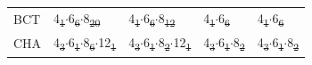 \documentclass[preprint,numrefs,noinfo,sort&compress]{elsarticle}
\providecommand{\DIFadd}[1]{{\protect\color{blue}\uwave{#1}}} %
\providecommand{\DIFdel}[1]{{\protect\color{red}\sout{#1}}}                      %
\providecommand{\DIFaddFL}[1]{\DIFadd{#1}} %
\providecommand{\DIFdelFL}[1]{\DIFdel{#1}} %
\providecommand{\DIFaddbeginFL}{} %
\providecommand{\DIFaddendFL}{} %
\providecommand{\DIFdelbeginFL}{} %
\providecommand{\DIFdelendFL}{} %
\newcommand{\DIFscaledelfig}{0.5}
\newlength{\DIFdelgraphicswidth} %
\newlength{\DIFdelgraphicsheight} %
\newcommand{\DIFaddincludegraphics}[2][]{{\color{blue}\fbox{\DIFOincludegraphics[#1]{#2}}}} %
\newcommand{\DIFdelincludegraphics}[2][]{%
\sbox{\DIFdelgraphicsbox}{\DIFOincludegraphics[#1]{#2}}%
\settoboxwidth{\DIFdelgraphicswidth}{\DIFdelgraphicsbox} %
\settoboxtotalheight{\DIFdelgraphicsheight}{\DIFdelgraphicsbox} %
\scalebox{\DIFscaledelfig}{%
\parbox[b]{\DIFdelgraphicswidth}{\usebox{\DIFdelgraphicsbox}\\[-\baselineskip] \rule{\DIFdelgraphicswidth}{0em}}\llap{\resizebox{\DIFdelgraphicswidth}{\DIFdelgraphicsheight}{%
\setlength{\unitlength}{\DIFdelgraphicswidth}%
\begin{picture}(1,1)%
\thicklines\linethickness{2pt} %
{\color[rgb]{1,0,0}\put(0,0){\framebox(1,1){}}}%
{\color[rgb]{1,0,0}\put(0,0){\line( 1,1){1}}}%
{\color[rgb]{1,0,0}\put(0,1){\line(1,-1){1}}}%
\end{picture}%
}\hspace*{3pt}}} %
} %
\DeclareRobustCommand{\DIFaddbeginFL}{\DIFOaddbeginFL \let\includegraphics\DIFaddincludegraphics} %
\DeclareRobustCommand{\DIFaddendFL}{\DIFOaddendFL \let\includegraphics\DIFOincludegraphics} %
\DeclareRobustCommand{\DIFdelbeginFL}{\DIFOdelbeginFL \let\includegraphics\DIFdelincludegraphics} %
\DeclareRobustCommand{\DIFdelendFL}{\DIFOaddendFL \let\includegraphics\DIFOincludegraphics} %
\begin{document}
\begin{table}
\begin{threeparttable}
{\begin{tabular}{lllll}
BCT & 4\DIFdelbeginFL \DIFdelFL{\textsubscript{1}\(\cdot\)}\DIFdelendFL \DIFaddbeginFL \DIFaddFL{\(_{\text{1}} \cdot\)}\DIFaddendFL 6\DIFdelbeginFL \DIFdelFL{\textsubscript{6}\(\cdot\)}\DIFdelendFL \DIFaddbeginFL \DIFaddFL{\(_{\text{6}} \cdot\)}\DIFaddendFL 8\DIFdelbeginFL \DIFdelFL{\textsubscript{20} }\DIFdelendFL \DIFaddbeginFL \DIFaddFL{\(_{\text{20}}\) }\DIFaddendFL & 4\DIFdelbeginFL \DIFdelFL{\textsubscript{1}\(\cdot\)}\DIFdelendFL \DIFaddbeginFL \DIFaddFL{\(_{\text{1}} \cdot\)}\DIFaddendFL 6\DIFdelbeginFL \DIFdelFL{\textsubscript{6}\(\cdot\)}\DIFdelendFL \DIFaddbeginFL \DIFaddFL{\(_{\text{6}} \cdot\)}\DIFaddendFL 8\DIFdelbeginFL \DIFdelFL{\textsubscript{12} }\DIFdelendFL \DIFaddbeginFL \DIFaddFL{\(_{\text{12}}\) }\DIFaddendFL & 4\DIFdelbeginFL \DIFdelFL{\textsubscript{1}\(\cdot\)}\DIFdelendFL \DIFaddbeginFL \DIFaddFL{\(_{\text{1}} \cdot\)}\DIFaddendFL 6\DIFdelbeginFL \DIFdelFL{\textsubscript{6} }\DIFdelendFL \DIFaddbeginFL \DIFaddFL{\(_{\text{6}}\) }\DIFaddendFL & 4\DIFdelbeginFL \DIFdelFL{\textsubscript{1}\(\cdot\)}\DIFdelendFL \DIFaddbeginFL \DIFaddFL{\(_{\text{1}} \cdot\)}\DIFaddendFL 6\DIFdelbeginFL \DIFdelFL{\textsubscript{6}}\DIFdelendFL \DIFaddbeginFL \DIFaddFL{\(_{\text{6}}\)}\DIFaddendFL \\
CHA & 4\DIFdelbeginFL \DIFdelFL{\textsubscript{3}\(\cdot\)}\DIFdelendFL \DIFaddbeginFL \DIFaddFL{\(_{\text{3}} \cdot\)}\DIFaddendFL 6\DIFdelbeginFL \DIFdelFL{\textsubscript{1}\(\cdot\)}\DIFdelendFL \DIFaddbeginFL \DIFaddFL{\(_{\text{1}} \cdot\)}\DIFaddendFL 8\DIFdelbeginFL \DIFdelFL{\textsubscript{6}\(\cdot\)}\DIFdelendFL \DIFaddbeginFL \DIFaddFL{\(_{\text{6}} \cdot\)}\DIFaddendFL 12\DIFdelbeginFL \DIFdelFL{\textsubscript{1} }\DIFdelendFL \DIFaddbeginFL \DIFaddFL{\(_{\text{1}}\) }\DIFaddendFL & 4\DIFdelbeginFL \DIFdelFL{\textsubscript{3}\(\cdot\)}\DIFdelendFL \DIFaddbeginFL \DIFaddFL{\(_{\text{3}} \cdot\)}\DIFaddendFL 6\DIFdelbeginFL \DIFdelFL{\textsubscript{1}\(\cdot\)}\DIFdelendFL \DIFaddbeginFL \DIFaddFL{\(_{\text{1}} \cdot\)}\DIFaddendFL 8\DIFdelbeginFL \DIFdelFL{\textsubscript{2}\(\cdot\)}\DIFdelendFL \DIFaddbeginFL \DIFaddFL{\(_{\text{2}} \cdot\)}\DIFaddendFL 12\DIFdelbeginFL \DIFdelFL{\textsubscript{1} }\DIFdelendFL \DIFaddbeginFL \DIFaddFL{\(_{\text{1}}\) }\DIFaddendFL & 4\DIFdelbeginFL \DIFdelFL{\textsubscript{3}\(\cdot\)}\DIFdelendFL \DIFaddbeginFL \DIFaddFL{\(_{\text{3}} \cdot\)}\DIFaddendFL 6\DIFdelbeginFL \DIFdelFL{\textsubscript{1}\(\cdot\)}\DIFdelendFL \DIFaddbeginFL \DIFaddFL{\(_{\text{1}} \cdot\)}\DIFaddendFL 8\DIFdelbeginFL \DIFdelFL{\textsubscript{2} }\DIFdelendFL \DIFaddbeginFL \DIFaddFL{\(_{\text{2}}\) }\DIFaddendFL & 4\DIFdelbeginFL \DIFdelFL{\textsubscript{3}\(\cdot\)}\DIFdelendFL \DIFaddbeginFL \DIFaddFL{\(_{\text{3}} \cdot\)}\DIFaddendFL 6\DIFdelbeginFL \DIFdelFL{\textsubscript{1}\(\cdot\)}\DIFdelendFL \DIFaddbeginFL \DIFaddFL{\(_{\text{1}} \cdot\)}\DIFaddendFL 8\DIFdelbeginFL \DIFdelFL{\textsubscript{2}}\DIFdelendFL \DIFaddbeginFL \DIFaddFL{\(_{\text{2}}\)}\DIFaddendFL \\

\end{tabular}}
\end{threeparttable}
\end{table}
\end{document}
